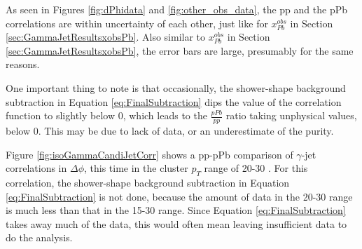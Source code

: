 As seen in Figures \ref{fig:dPhidata} and \ref{fig:other_obs_data}, the pp and the pPb correlations are within uncertainty of each other, just like for $x^{obs}_{Pb}$ in Section \ref{sec:GammaJetResultsxobsPb}. Also similar to $x^{obs}_{Pb}$ in Section \ref{sec:GammaJetResultsxobsPb}, the error bars are large, presumably for the same reasons. 

One important thing to note is that occasionally, the shower-shape background subtraction in Equation \ref{eq:FinalSubtraction} dips the value of the correlation function to slightly below 0, which leads to the $\frac{pPb}{pp}$ ratio taking unphysical values, below 0. This may be due to lack of data, or an underestimate of the purity.

Figure \ref{fig:isoGammaCandiJetCorr} shows a pp-pPb comparison of $\gamma$-jet correlations in $\Delta \phi$, this time in the cluster $p_{T}$ range of 20-30 \GeVc. For this correlation, the shower-shape background subtraction in Equation \ref{eq:FinalSubtraction} is not done, because the amount of data in the 20-30 \GeVc range is much less than that in the 15-30 \GeVc range. Since Equation \ref{eq:FinalSubtraction} takes away much of the data, this would often mean leaving insufficient data to do the analysis.


